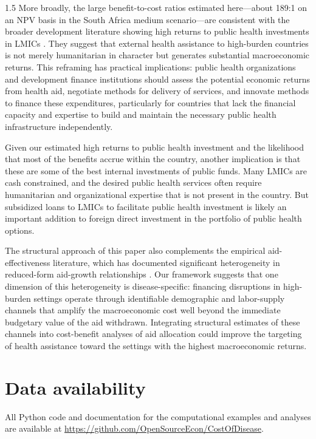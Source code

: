 \documentclass[letterpaper,12pt]{article}
\theoremstyle{definition}
\begin{document}
\begin{spacing}{1.5}
More broadly, the large benefit-to-cost ratios estimated here---about 189:1 on an NPV basis in the South Africa medium scenario---are consistent with the broader development literature showing high returns to public health investments in LMICs \citep{coleImpactPoorHealth2006,turanLifeExpectancyEconomic2020}. They suggest that external health assistance to high-burden countries is not merely humanitarian in character but generates substantial macroeconomic returns. This reframing has practical implications: public health organizations and development finance institutions should assess the potential economic returns from health aid, negotiate methods for delivery of services, and innovate methods to finance these expenditures, particularly for countries that lack the financial capacity and expertise to build and maintain the necessary public health infrastructure independently.

Given our estimated high returns to public health investment and the likelihood that most of the benefits accrue within the country, another implication is that these are some of the best internal investments of public funds. Many LMICs are cash constrained, and the desired public health services often require humanitarian and organizational expertise that is not present in the country. But subsidized loans to LMICs to facilitate public health investment is likely an important addition to foreign direct investment in the portfolio of public health options.

The structural approach of this paper also complements the empirical aid-effectiveness literature, which has documented significant heterogeneity in reduced-form aid-growth relationships \citep{BurnsideDollar:2000}. Our framework suggests that one dimension of this heterogeneity is disease-specific: financing disruptions in high-burden settings operate through identifiable demographic and labor-supply channels that amplify the macroeconomic cost well beyond the immediate budgetary value of the aid withdrawn. Integrating structural estimates of these channels into cost-benefit analyses of aid allocation could improve the targeting of health assistance toward the settings with the highest macroeconomic returns.


\end{spacing}

\section*{Data availability}

All Python code and documentation for the computational examples and analyses are available at \href{https://github.com/OpenSourceEcon/CostOfDisease}{https://github.com/OpenSourceEcon/CostOfDisease}.



\end{document}
